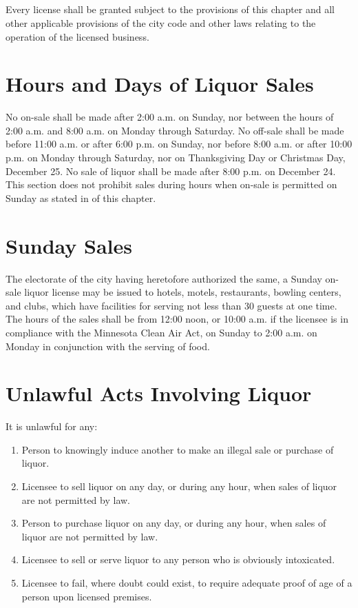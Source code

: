 \subsection{}
Every license shall be granted subject to the provisions of this chapter and all other applicable provisions of the city code and other laws relating to the operation of the licensed business.

\section{Hours and Days of Liquor Sales}
No on-sale shall be made after 2:00 a.m. on Sunday, nor between the hours of 2:00 a.m. and 8:00 a.m. on Monday through Saturday.  No off-sale shall be made before 11:00 a.m. or after 6:00 p.m. on Sunday, nor before 8:00 a.m. or after 10:00 p.m. on Monday through Saturday, nor on Thanksgiving Day or Christmas Day, December 25.  No sale of liquor shall be made after 8:00 p.m. on December 24.  This section does not prohibit sales during hours when on-sale is permitted on Sunday as stated in  of this chapter.

\section{Sunday Sales}
The electorate of the city having heretofore authorized the same, a Sunday on-sale liquor license may be issued to hotels, motels, restaurants, bowling centers, and clubs, which have facilities for serving not less than 30 guests at one time.  The hours of the sales shall be from 12:00 noon, or 10:00 a.m. if the licensee is in compliance with the Minnesota Clean Air Act, on Sunday to 2:00 a.m. on Monday in conjunction with the serving of food.

\section{Unlawful Acts Involving Liquor}
It is unlawful for any:
\begin{enumerate}[{\indent}A)]
    \item Person to knowingly induce another to make an illegal sale or purchase of liquor.
    \item Licensee to sell liquor on any day, or during any hour, when sales of liquor are not permitted by law.
    \item Person to purchase liquor on any day, or during any hour, when sales of liquor are not permitted by law.
    \item Licensee to sell or serve liquor to any person who is obviously intoxicated.
    \item Licensee to fail, where doubt could exist, to require adequate proof of age of a person upon licensed premises.
\end{enumerate}


